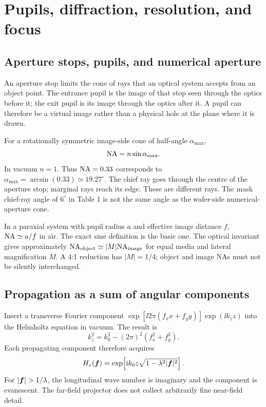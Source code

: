 \chapter{Pupils, diffraction, resolution, and focus}\label{ch:diffraction}

\section{Aperture stops, pupils, and numerical aperture}
An aperture stop limits the cone of rays that an optical system accepts
from an object point. The entrance pupil is the image of that stop seen
through the optics before it; the exit pupil is its image through the
optics after it. A pupil can therefore be a virtual image rather than a
physical hole at the plane where it is drawn.

For a rotationally symmetric image-side cone of half-angle $\alpha_{\max}$,
\begin{equation}
\mathrm{NA}=n\sin\alpha_{\max}.
\label{eq:NA}
\end{equation}
In vacuum $n=1$. Thus $\mathrm{NA}=0.33$ corresponds to
$\alpha_{\max}=\arcsin(0.33)\simeq19.27^\circ$.
The chief ray goes through the centre of the aperture stop; marginal rays
reach its edge. These are different rays.
The mask chief-ray angle of $6^\circ$ in Table 1 is not the same angle as
the wafer-side numerical-aperture cone.

In a paraxial system with pupil radius $a$ and effective image distance $f$,
$\mathrm{NA}\simeq a/f$ in air. The exact sine definition is the basic one.
The optical invariant gives approximately
$\mathrm{NA}_{\rm object}\simeq |M|\mathrm{NA}_{\rm image}$ for equal media and lateral
magnification $M$. A 4:1 reduction has $|M|=1/4$; object and image NAs
must not be silently interchanged.

\section{Propagation as a sum of angular components}
Insert a transverse Fourier component
$\exp[\ii2\pi(f_xx+f_yy)]\exp(\ii k_z z)$ into the Helmholtz equation
in vacuum. The result is
\[
k_z^2=k_0^2-(2\pi)^2(f_x^2+f_y^2).
\]
Each propagating component therefore acquires
\begin{equation}
H_z(\bm{f})=
\exp\!\left[\mathrm{i} k_0z\sqrt{1-\lambda^2|\bm{f}|^2}\right].
\label{eq:angularprop}
\end{equation}
For $|\vct f|>1/\lambda$, the longitudinal wave number is imaginary and
the component is evanescent. The far-field projector does not collect
arbitrarily fine near-field detail.

